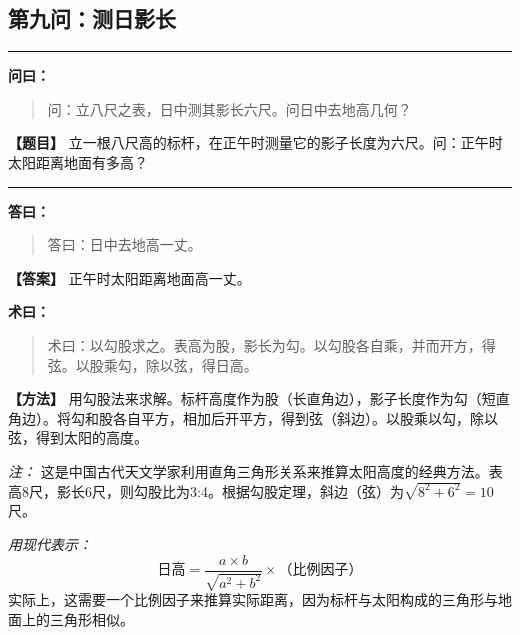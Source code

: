 \documentclass[11pt,a4paper]{article}
\newenvironment{mathproblem}[1][]{%
  \medskip\noindent\rule{\textwidth}{0.4pt}%
  \par\noindent{\Large\bfseries\color{sectioncolor}#1}\par\nopagebreak%
  \smallskip%
}{%
  \par\noindent\rule{\textwidth}{0.4pt}\medskip%
}
\newcommand{\wenlabel}{\textbf{\color{origcolor}问曰：}}
\newcommand{\dalabel}{\textbf{\color{origcolor}答曰：}}
\newcommand{\shulabel}{\textbf{\color{origcolor}术曰：}}
\newcommand{\modwenlabel}{\textbf{\color{modcolor}【题目】}}
\newcommand{\moddalabel}{\textbf{\color{modcolor}【答案】}}
\newcommand{\modshulabel}{\textbf{\color{modcolor}【方法】}}
\begin{document}
\subsection*{第九问：测日影长}

\begin{mathproblem}[\textbf{第九问：测日影长}]

\begin{originaltext}
\wenlabel
\begin{quote}
\textcolor{origcolor}{%
问：立八尺之表，日中测其影长六尺。问日中去地高几何？
}
\end{quote}
\end{originaltext}

\begin{moderntext}
\modwenlabel
立一根八尺高的标杆，在正午时测量它的影子长度为六尺。问：正午时太阳距离地面有多高？
\end{moderntext}

\end{mathproblem}

\begin{originaltext}
\dalabel
\begin{quote}
\textcolor{origcolor}{%
答曰：日中去地高一丈。
}
\end{quote}
\end{originaltext}

\begin{moderntext}
\moddalabel
正午时太阳距离地面高一丈。
\end{moderntext}

\begin{originaltext}
\shulabel
\begin{quote}
\textcolor{origcolor}{%
术曰：以勾股求之。表高为股，影长为勾。以勾股各自乘，并而开方，得弦。以股乘勾，除以弦，得日高。
}
\end{quote}
\end{originaltext}

\begin{moderntext}
\modshulabel
用勾股法来求解。标杆高度作为股（长直角边），影子长度作为勾（短直角边）。将勾和股各自平方，相加后开平方，得到弦（斜边）。以股乘以勾，除以弦，得到太阳的高度。

\textit{注：} 这是中国古代天文学家利用直角三角形关系来推算太阳高度的经典方法。表高8尺，影长6尺，则勾股比为3:4。根据勾股定理，斜边（弦）为$\sqrt{8^2 + 6^2} = 10$尺。

\textit{用现代表示：}
\[
\text{日高} = \frac{a \times b}{\sqrt{a^2 + b^2}} \times \text{（比例因子）}
\]
实际上，这需要一个比例因子来推算实际距离，因为标杆与太阳构成的三角形与地面上的三角形相似。
\end{moderntext}
\end{document}
